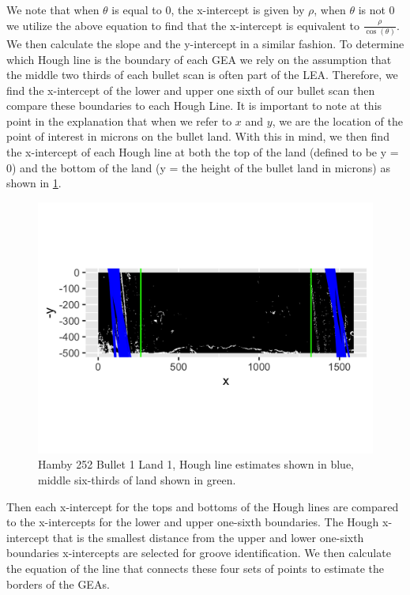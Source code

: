 \documentclass[12pt]{article}
\theoremstyle{nonumberplain}
\begin{document}
We note that when $\theta$ is equal to 0, the x-intercept is given by $\rho$, when $\theta$ is not 0 we utilize the above equation to find that the x-intercept is equivalent to $\frac{\rho}{\cos(\theta)}$. We then calculate the slope and the y-intercept in a similar fashion. To determine which Hough line is the boundary of each GEA we rely on the assumption that the middle two thirds of each bullet scan is often part of the LEA. Therefore, we find the x-intercept of the lower and upper one sixth of our bullet scan then compare these boundaries to each Hough Line. It is important to note at this point in the explanation that when we refer to $x$ and $y$, we are the location of the point of interest in microns on the bullet land. With this in mind, we then find the x-intercept of each Hough line at both the top of the land (defined to be y = 0) and the bottom of the land (y = the height of the bullet land in microns) as shown in \ref{fig: line-stepone}. 

\begin{figure}[!ht]
  \centering
  \includegraphics[width = .9\textwidth]{../images/Hamby252_Bullet1_Land1_hough_lines_process_step_one}
  \caption{Hamby 252 Bullet 1 Land 1, Hough line estimates shown in blue, middle six-thirds of land shown in green.}
  \label{fig: line-stepone}
\end{figure}

Then each x-intercept for the tops and bottoms of the Hough lines are compared to the x-intercepts for the lower and upper one-sixth boundaries. The Hough x-intercept that is the smallest distance from the upper and lower one-sixth boundaries x-intercepts are selected for groove identification. We then calculate the equation of the line that connects these four sets of points to estimate the borders of the GEAs. 
\end{document}
